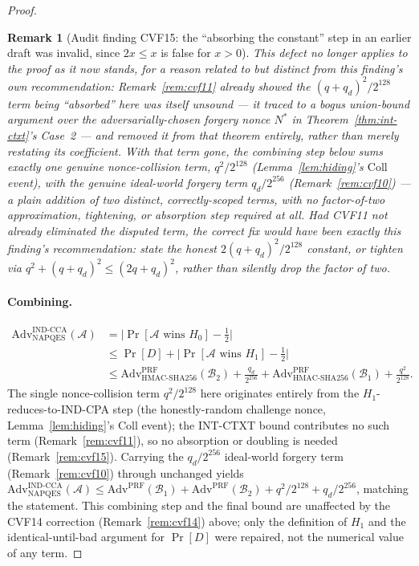 \documentclass[11pt,a4paper]{article}
\newtheorem{remark}[theorem]{Remark}
\begin{document}
\begin{proof}
\begin{remark}[Audit finding CVF15: the ``absorbing the constant'' step in an earlier draft was invalid, since $2x \leq x$ is false for $x>0$]
This defect no longer applies to the proof as it now stands, for a reason
related to but distinct from this finding's own recommendation:
Remark~\ref{rem:cvf11} already showed the $(q+q_d)^2/2^{128}$ term being
``absorbed'' here was itself unsound --- it traced to a bogus union-bound
argument over the adversarially-chosen forgery nonce $N^*$ in
Theorem~\ref{thm:int-ctxt}'s Case~2 --- and removed it from that theorem
entirely, rather than merely restating its coefficient. With that term
gone, the combining step below sums exactly one genuine nonce-collision
term, $q^2/2^{128}$ (Lemma~\ref{lem:hiding}'s $\mathrm{Coll}$ event), with
the genuine ideal-world forgery term $q_d/2^{256}$ (Remark~\ref{rem:cvf10})
--- a plain addition of two distinct, correctly-scoped terms, with no
factor-of-two approximation, tightening, or absorption step required at
all. Had CVF11 not already eliminated the disputed term, the correct fix
would have been exactly this finding's recommendation: state the honest
$2(q+q_d)^2/2^{128}$ constant, or tighten via
$q^2+(q+q_d)^2 \leq (2q+q_d)^2$, rather than silently drop the factor of
two.
\end{remark}

\paragraph{Combining.}
\begin{align*}
  \mathrm{Adv}^{\mathrm{IND\text{-}CCA}}_{\mathrm{NAPQES}}(\mathcal{A})
  &= \bigl|\Pr[\mathcal{A}\text{ wins }H_0] - \tfrac{1}{2}\bigr| \\
  &\leq \Pr[D]
       + \bigl|\Pr[\mathcal{A}\text{ wins }H_1] - \tfrac{1}{2}\bigr| \\
  &\leq \mathrm{Adv}^{\mathrm{PRF}}_{\mathrm{HMAC\text{-}SHA256}}(\mathcal{B}_2)
       + \frac{q_d}{2^{256}}
       + \mathrm{Adv}^{\mathrm{PRF}}_{\mathrm{HMAC\text{-}SHA256}}(\mathcal{B}_1)
       + \frac{q^2}{2^{128}}.
\end{align*}
The single nonce-collision term $q^2/2^{128}$ here originates entirely
from the $H_1$-reduces-to-IND-CPA step (the honestly-random challenge
nonce, Lemma~\ref{lem:hiding}'s $\mathrm{Coll}$ event); the INT-CTXT bound
contributes no such term (Remark~\ref{rem:cvf11}), so no absorption or
doubling is needed (Remark~\ref{rem:cvf15}). Carrying the $q_d/2^{256}$ ideal-world forgery term
(Remark~\ref{rem:cvf10}) through unchanged yields
$\mathrm{Adv}^{\mathrm{IND\text{-}CCA}}_{\mathrm{NAPQES}}(\mathcal{A})
\leq \mathrm{Adv}^{\mathrm{PRF}}(\mathcal{B}_1)
   + \mathrm{Adv}^{\mathrm{PRF}}(\mathcal{B}_2)
   + q^2/2^{128}
   + q_d/2^{256}$,
matching the statement. This combining step and the final bound are
unaffected by the CVF14 correction (Remark~\ref{rem:cvf14}) above; only
the definition of $H_1$ and the identical-until-bad argument for
$\Pr[D]$ were repaired, not the numerical value of any term.
\qedhere
\end{proof}
\end{document}
